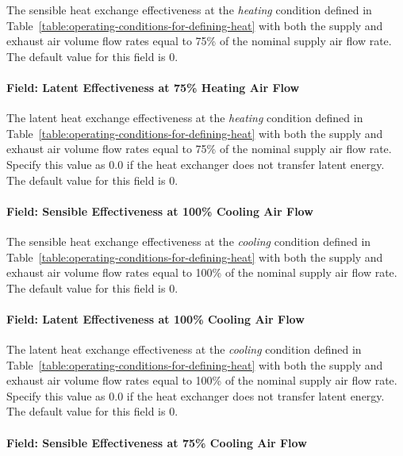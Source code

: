The sensible heat exchange effectiveness at the \emph{heating} condition defined in Table~\ref{table:operating-conditions-for-defining-heat} with both the supply and exhaust air volume flow rates equal to 75\% of the nominal supply air flow rate. The default value for this field is 0.

\paragraph{Field: Latent Effectiveness at 75\% Heating Air Flow}\label{field-latent-effectiveness-at-75-heating-air-flow}

The latent heat exchange effectiveness at the \emph{heating} condition defined in Table~\ref{table:operating-conditions-for-defining-heat} with both the supply and exhaust air volume flow rates equal to 75\% of the nominal supply air flow rate. Specify this value as 0.0 if the heat exchanger does not transfer latent energy. The default value for this field is 0.

\paragraph{Field: Sensible Effectiveness at 100\% Cooling Air Flow}\label{field-sensible-effectiveness-at-100-cooling-air-flow}

The sensible heat exchange effectiveness at the \emph{cooling} condition defined in Table~\ref{table:operating-conditions-for-defining-heat} with both the supply and exhaust air volume flow rates equal to 100\% of the nominal supply air flow rate. The default value for this field is 0.

\paragraph{Field: Latent Effectiveness at 100\% Cooling Air Flow}\label{field-latent-effectiveness-at-100-cooling-air-flow}

The latent heat exchange effectiveness at the \emph{cooling} condition defined in Table~\ref{table:operating-conditions-for-defining-heat} with both the supply and exhaust air volume flow rates equal to 100\% of the nominal supply air flow rate. Specify this value as 0.0 if the heat exchanger does not transfer latent energy. The default value for this field is 0.

\paragraph{Field: Sensible Effectiveness at 75\% Cooling Air Flow}\label{field-sensible-effectiveness-at-75-cooling-air-flow}

